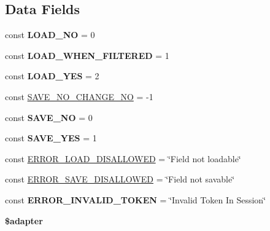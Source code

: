 \subsection*{\-Data \-Fields}
\begin{DoxyCompactItemize}
\item 
\hypertarget{class_ac_field_af23c7c454f232dfd26effef86c7f305b}{const {\bfseries \-L\-O\-A\-D\-\_\-\-N\-O} = 0}\label{class_ac_field_af23c7c454f232dfd26effef86c7f305b}

\item 
\hypertarget{class_ac_field_a215d3f7aa931937b8c87d64faee8831c}{const {\bfseries \-L\-O\-A\-D\-\_\-\-W\-H\-E\-N\-\_\-\-F\-I\-L\-T\-E\-R\-E\-D} = 1}\label{class_ac_field_a215d3f7aa931937b8c87d64faee8831c}

\item 
\hypertarget{class_ac_field_a79f7fa84cc5296959c163f22bb4370bd}{const {\bfseries \-L\-O\-A\-D\-\_\-\-Y\-E\-S} = 2}\label{class_ac_field_a79f7fa84cc5296959c163f22bb4370bd}

\item 
const \hyperlink{class_ac_field_af4bf3faa0b703eca1f81a94ca49f9fd1}{\-S\-A\-V\-E\-\_\-\-N\-O\-\_\-\-C\-H\-A\-N\-G\-E\-\_\-\-N\-O} = -\/1
\item 
\hypertarget{class_ac_field_ad7d1969483952ab9153261bac9c2baf2}{const {\bfseries \-S\-A\-V\-E\-\_\-\-N\-O} = 0}\label{class_ac_field_ad7d1969483952ab9153261bac9c2baf2}

\item 
\hypertarget{class_ac_field_a00cabcb2dd296de42c5caf8f45745229}{const {\bfseries \-S\-A\-V\-E\-\_\-\-Y\-E\-S} = 1}\label{class_ac_field_a00cabcb2dd296de42c5caf8f45745229}

\item 
const \hyperlink{class_ac_field_adbff611f2736d3c98246ca6f281b38d5}{\-E\-R\-R\-O\-R\-\_\-\-L\-O\-A\-D\-\_\-\-D\-I\-S\-A\-L\-L\-O\-W\-E\-D} = \char`\"{}\-Field not loadable\char`\"{}
\item 
const \hyperlink{class_ac_field_a558a9054a2279ebccbe00f2436842369}{\-E\-R\-R\-O\-R\-\_\-\-S\-A\-V\-E\-\_\-\-D\-I\-S\-A\-L\-L\-O\-W\-E\-D} = \char`\"{}\-Field not savable\char`\"{}
\item 
\hypertarget{class_ac_field_ad8bfbbf7ff76d678f35a92605cc80a23}{const {\bfseries \-E\-R\-R\-O\-R\-\_\-\-I\-N\-V\-A\-L\-I\-D\-\_\-\-T\-O\-K\-E\-N} = \char`\"{}\-Invalid \-Token \-In \-Session\char`\"{}}\label{class_ac_field_ad8bfbbf7ff76d678f35a92605cc80a23}

\item 
\hypertarget{class_ac_field_a3b91361f38329fa658ca89426078d7f3}{{\bfseries \$adapter}}\label{class_ac_field_a3b91361f38329fa658ca89426078d7f3}


\end{DoxyCompactItemize}
